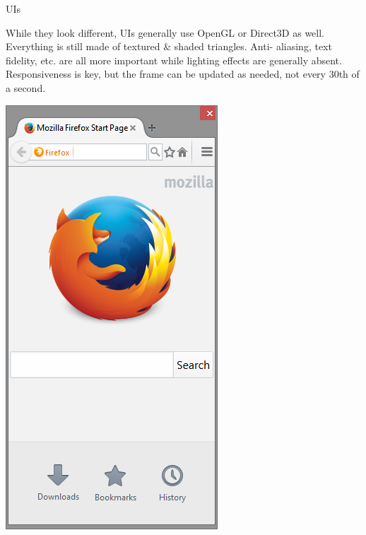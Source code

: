 \documentclass{lug}
\begin{document}
\begin{frame}{UIs}
    \noindent
    \begin{minipage}{.7\textwidth - 1.5em}
        \small

        While they look different, UIs generally use OpenGL or Direct3D as
        well. Everything is still made of textured \& shaded triangles. Anti-%
        aliasing, text fidelity, etc. are all more important while lighting
        effects are generally absent. Responsiveness is key, but the frame can
        be updated as needed, not every 30th of a second.

    \end{minipage}%
    \hspace{1.5em}%
    \begin{minipage}{.3\textwidth}
        \includegraphics[width=\textwidth]{graphics/firefox_start}
    \end{minipage}
\end{frame}
\end{document}
